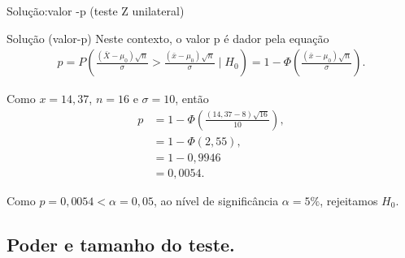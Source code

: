 \documentclass[8pt]{beamer}
\begin{document}
\begin{frame}{Solução:valor -p (teste Z unilateral)}

\begin{block}{Solução (valor-p)}
	Neste contexto, o valor p é dador pela equação
\begin{align*}
p = P\left( \frac{(\bar{X} - \mu_0)\sqrt{n}}{\sigma} > \frac{(\bar{x} - \mu_0)\sqrt{n}}{\sigma}  \mid H_0  \right) = 1 - \Phi \left( \frac{(\bar{x} - \mu_0)\sqrt{n}}{\sigma} \right).
\end{align*}
\vfill

Como $x=14,37$, $n=16$ e $\sigma=10$, então
\begin{align*}
p &= 1 - \Phi \left( \frac{(14,37 - 8)\sqrt{16}}{10} \right),\\
&= 1- \Phi\left( 2,55 \right),\\
&= 1 - 0,9946\\
&= 0,0054.
\end{align*}
\vfill

Como $p=0,0054 < \alpha=0,05$, ao nível de significância $\alpha = 5\%$, rejeitamos $H_0$.	
\end{block}

\end{frame}

\subsection{Poder e tamanho do teste.}
\end{document}
